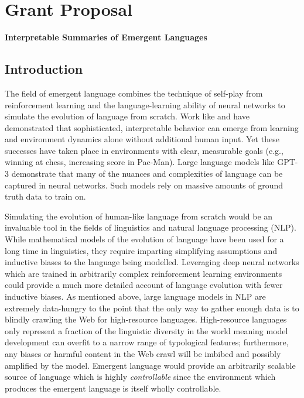 \chapter{Grant Proposal}

{\Large\bf Interpretable Summaries of Emergent Languages}

\section{Introduction}

The field of emergent language combines the technique of self-play from reinforcement learning and the language-learning ability of neural networks to simulate the evolution of language from scratch.
Work like  and  have demonstrated that sophisticated, interpretable behavior can emerge from learning and environment dynamics alone without additional human input.
Yet these successes have taken place in environments with clear, measurable goals (e.g., winning at chess, increasing score in Pac-Man).
Large language models like GPT-3  demonstrate that many of the nuances and complexities of language can be captured in neural networks.
Such models rely on massive amounts of ground truth data to train on.

Simulating the evolution of human-like language from scratch would be an invaluable tool in the fields of linguistics and natural language processing (NLP).
While mathematical models of the evolution of language have been used for a long time in linguistics, they require imparting simplifying assumptions and inductive biases to the language being modelled.
Leveraging deep neural networks which are trained in arbitrarily complex reinforcement learning environments could provide a much more detailed account of language evolution with fewer inductive biases.
As mentioned above, large language models in NLP are extremely data-hungry to the point that the only way to gather enough data is to blindly crawling the Web  for high-resource languages.
High-resource languages only represent a fraction of the linguistic diversity in the world meaning model development can overfit to a narrow range of typological features; furthermore, any biases or harmful content in the Web crawl will be imbibed and possibly amplified by the model.
Emergent language would provide an arbitrarily scalable source of language which is highly \emph{controllable} since the environment which produces the emergent language is itself wholly controllable.


